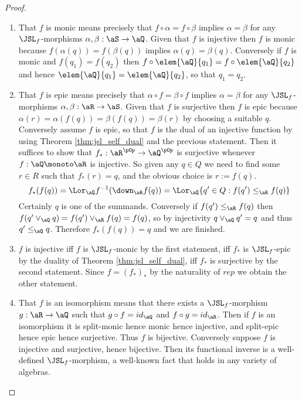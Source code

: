 \documentclass{article}
\begin{document}
\begin{proof}
\item
\begin{enumerate}
\item
That $f$ is monic means precisely that $f \circ \alpha = f \circ \beta$ implies $\alpha = \beta$ for any $\JSL_f$-morphisms $\alpha,\beta : \aS \to \aQ$. Given that $f$ is injective then $f$ is monic because $f(\alpha(q)) = f(\beta(q))$ implies $\alpha(q) = \beta(q)$. Conversely if $f$ is monic and $f(q_1) = f(q_2)$ then $f \circ \elem{\aQ}{q_1} = f \circ \elem{\aQ}{q_2}$ and hence $\elem{\aQ}{q_1} = \elem{\aQ}{q_2}$, so that $q_1 = q_2$.
\item
That $f$ is epic means precisely that $\alpha \circ f = \beta \circ f$ implies $\alpha = \beta$ for any $\JSL_f$-morphisms $\alpha,\beta : \aR \to \aS$. Given that $f$ is surjective then $f$ is epic because $\alpha(r) = \alpha(f(q)) = \beta(f(q)) = \beta(r)$ by choosing a suitable $q$. Conversely assume $f$ is epic, so that $f$ is the dual of an injective function by using Theorem \ref{thm:jsl_self_dual} and the previous statement. Then it suffices to show that $f_* : \aR^{\pOp} \to \aQ^{\pOp}$ is surjective whenever $f : \aQ \monoto \aR$ is injective. So given any $q \in Q$ we need to find some $r \in R$ such that $f_*(r) = q$, and the obvious choice is $r := f(q)$.
\[
f_*(f(q))
= \Lor_\aQ f^{-1}(\down_\aR f(q))
= \Lor_\aQ \{ q' \in Q : f(q') \leq_\aR f(q) \}
\]
Certainly $q$ is one of the summands. Conversely if $f(q') \leq_\aR f(q)$ then $f(q' \lor_\aQ q) = f(q') \lor_\aR f(q) = f(q)$, so by injectivity $q \lor_\aQ q' = q$ and thus $q' \leq_\aQ q$. Therefore $f_*(f(q)) = q$ and we are finished.

\item
$f$ is injective iff $f$ is $\JSL_f$-monic by the first statement, iff $f_*$ is $\JSL_f$-epic by the duality of Theorem \ref{thm:jsl_self_dual}, iff $f_*$ is surjective by the second statement. Since $f = (f_*)_*$ by the naturality of $rep$ we obtain the other statement.

\item
That $f$ is an isomorphism means that there exists a $\JSL_f$-morphism $g : \aR \to \aQ$ such that $g \circ f = id_\aQ$ and $f \circ g = id_\aR$. Then if $f$ is an isomorphism it is split-monic hence monic hence injective, and split-epic hence epic hence surjective. Thus $f$ is bijective. Conversely suppose $f$ is injective and surjective, hence bijective. Then its functional inverse is a well-defined $\JSL_f$-morphism, a well-known fact that holds in any variety of algebras.

\end{enumerate}
\end{proof}
\end{document}
